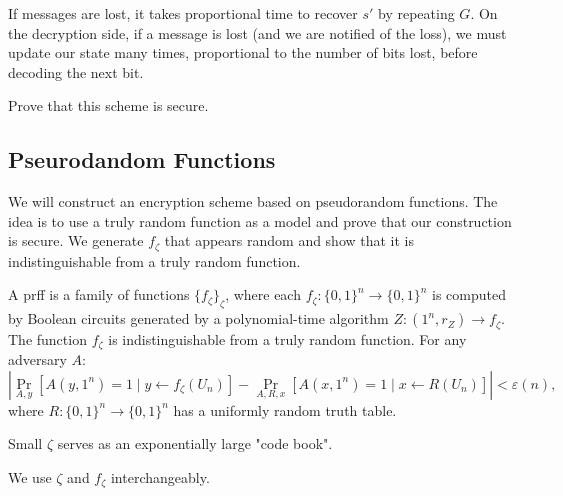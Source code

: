If messages are lost, it takes proportional time to recover $s'$ by repeating $G$.
On the decryption side, if a message is lost (and we are notified of the loss), we must update our state many times, proportional to the number of bits lost, before decoding the next bit.

\begin{exercise}
    Prove that this scheme is secure.
\end{exercise}

\subsection{Pseurodandom Functions}

We will construct an encryption scheme based on pseudorandom functions.
The idea is to use a truly random function as a model and prove that our construction is secure.
We generate $f_{\zeta}$ that appears random and show that it is indistinguishable from a truly random function.

\begin{definition}
    A prff is a family of functions $\{f_{\zeta}\}_{\zeta}$, where each $f_{\zeta} \colon \{0, 1\}^{n} \to \{0, 1\}^{n}$ is computed by Boolean circuits generated by a polynomial-time algorithm $Z \colon (1^{n}, r_Z) \to f_{\zeta}$.
    The function $f_{\zeta}$ is indistinguishable from a truly random function.
    For any adversary $A$:
    \[
        \left|\Pr_{A, y}[A(y, 1^{n}) = 1 \mid y \gets f_{\zeta}(U_n)] - \Pr_{A, R, x}[A(x, 1^{n}) = 1 \mid x \gets R(U_n)]\right| < \varepsilon(n),
    \] 
    where $R \colon \{0, 1\}^{n} \to \{0, 1\}^{n}$ has a uniformly random truth table.
\end{definition}

Small $\zeta$ serves as an exponentially large "code book".
\begin{remark}
We use  $\zeta$ and  $f_{\zeta}$ interchangeably.
\end{remark}


